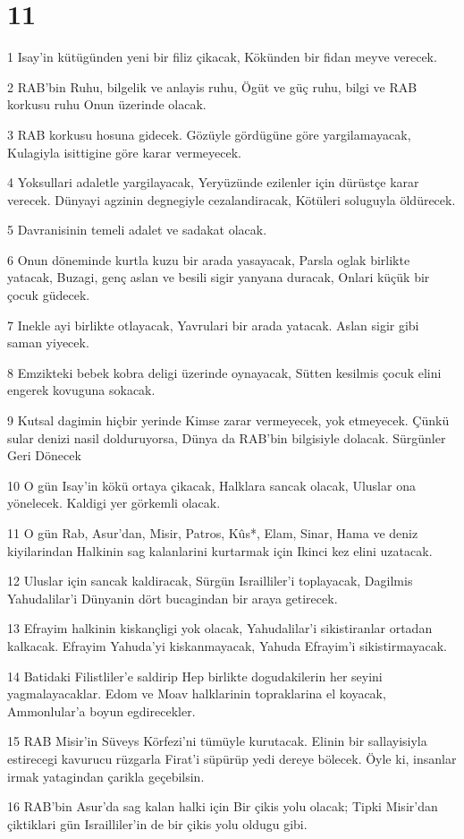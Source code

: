 \chapter{11}

\par 1 Isay'in kütügünden yeni bir filiz çikacak, Kökünden bir fidan meyve verecek.
\par 2 RAB'bin Ruhu, bilgelik ve anlayis ruhu, Ögüt ve güç ruhu, bilgi ve RAB korkusu ruhu Onun üzerinde olacak.
\par 3 RAB korkusu hosuna gidecek. Gözüyle gördügüne göre yargilamayacak, Kulagiyla isittigine göre karar vermeyecek.
\par 4 Yoksullari adaletle yargilayacak, Yeryüzünde ezilenler için dürüstçe karar verecek. Dünyayi agzinin degnegiyle cezalandiracak, Kötüleri soluguyla öldürecek.
\par 5 Davranisinin temeli adalet ve sadakat olacak.
\par 6 Onun döneminde kurtla kuzu bir arada yasayacak, Parsla oglak birlikte yatacak, Buzagi, genç aslan ve besili sigir yanyana duracak, Onlari küçük bir çocuk güdecek.
\par 7 Inekle ayi birlikte otlayacak, Yavrulari bir arada yatacak. Aslan sigir gibi saman yiyecek.
\par 8 Emzikteki bebek kobra deligi üzerinde oynayacak, Sütten kesilmis çocuk elini engerek kovuguna sokacak.
\par 9 Kutsal dagimin hiçbir yerinde Kimse zarar vermeyecek, yok etmeyecek. Çünkü sular denizi nasil dolduruyorsa, Dünya da RAB'bin bilgisiyle dolacak. Sürgünler Geri Dönecek
\par 10 O gün Isay'in kökü ortaya çikacak, Halklara sancak olacak, Uluslar ona yönelecek. Kaldigi yer görkemli olacak.
\par 11 O gün Rab, Asur'dan, Misir, Patros, Kûs*, Elam, Sinar, Hama ve deniz kiyilarindan Halkinin sag kalanlarini kurtarmak için Ikinci kez elini uzatacak.
\par 12 Uluslar için sancak kaldiracak, Sürgün Israilliler'i toplayacak, Dagilmis Yahudalilar'i Dünyanin dört bucagindan bir araya getirecek.
\par 13 Efrayim halkinin kiskançligi yok olacak, Yahudalilar'i sikistiranlar ortadan kalkacak. Efrayim Yahuda'yi kiskanmayacak, Yahuda Efrayim'i sikistirmayacak.
\par 14 Batidaki Filistliler'e saldirip Hep birlikte dogudakilerin her seyini yagmalayacaklar. Edom ve Moav halklarinin topraklarina el koyacak, Ammonlular'a boyun egdirecekler.
\par 15 RAB Misir'in Süveys Körfezi'ni tümüyle kurutacak. Elinin bir sallayisiyla estirecegi kavurucu rüzgarla Firat'i süpürüp yedi dereye bölecek. Öyle ki, insanlar irmak yatagindan çarikla geçebilsin.
\par 16 RAB'bin Asur'da sag kalan halki için Bir çikis yolu olacak; Tipki Misir'dan çiktiklari gün Israilliler'in de bir çikis yolu oldugu gibi.


